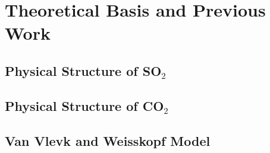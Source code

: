 \chapter{Theoretical Basis and Previous Work}

\section{Physical Structure of SO$_2$}
\section{Physical Structure of CO$_2$}
\section{Van Vlevk and Weisskopf Model}